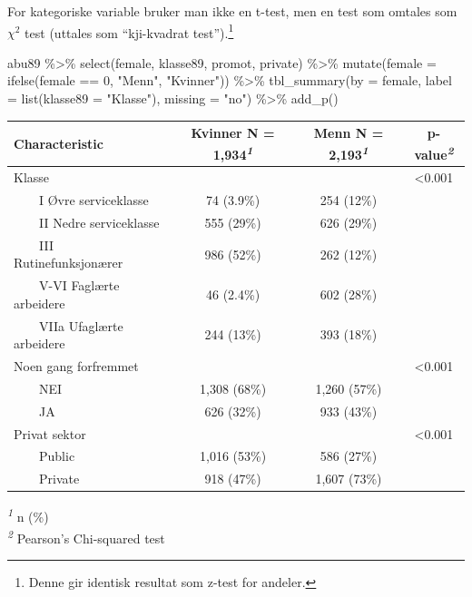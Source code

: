 \documentclass[
  norsk,
  letterpaper,
  DIV=11,
  numbers=noendperiod]{scrreprt}
\newenvironment{Shaded}{\begin{snugshade}}{\end{snugshade}}
\newcommand{\AttributeTok}[1]{\textcolor[rgb]{0.40,0.45,0.13}{#1}}
\newcommand{\DecValTok}[1]{\textcolor[rgb]{0.68,0.00,0.00}{#1}}
\newcommand{\FunctionTok}[1]{\textcolor[rgb]{0.28,0.35,0.67}{#1}}
\newcommand{\NormalTok}[1]{\textcolor[rgb]{0.00,0.23,0.31}{#1}}
\newcommand{\SpecialCharTok}[1]{\textcolor[rgb]{0.37,0.37,0.37}{#1}}
\newcommand{\StringTok}[1]{\textcolor[rgb]{0.13,0.47,0.30}{#1}}
\theoremstyle{definition}
\theoremstyle{remark}
\begin{document}
For kategoriske variable bruker man ikke en t-test, men en test som
omtales som \(\chi^2\) test (uttales som ``kji-kvadrat
test'').\footnote{Denne gir identisk resultat som z-test for andeler.}

\begin{Shaded}
\begin{Highlighting}[]
\NormalTok{abu89 }\SpecialCharTok{\%\textgreater{}\%} 
  \FunctionTok{select}\NormalTok{(female, klasse89, promot, private) }\SpecialCharTok{\%\textgreater{}\%} 
  \FunctionTok{mutate}\NormalTok{(}\AttributeTok{female =} \FunctionTok{ifelse}\NormalTok{(female }\SpecialCharTok{==} \DecValTok{0}\NormalTok{, }\StringTok{"Menn"}\NormalTok{, }\StringTok{"Kvinner"}\NormalTok{)) }\SpecialCharTok{\%\textgreater{}\%} 
    \FunctionTok{tbl\_summary}\NormalTok{(}\AttributeTok{by =}\NormalTok{ female, }
                \AttributeTok{label =} \FunctionTok{list}\NormalTok{(}\AttributeTok{klasse89 =} \StringTok{"Klasse"}\NormalTok{), }
              \AttributeTok{missing =} \StringTok{"no"}\NormalTok{) }\SpecialCharTok{\%\textgreater{}\%} 
  \FunctionTok{add\_p}\NormalTok{() }
\end{Highlighting}
\end{Shaded}

\begin{table}
\fontsize{12.0pt}{14.0pt}\selectfont
\begin{tabular*}{\linewidth}{@{\extracolsep{\fill}}lccc}
\toprule
\textbf{Characteristic} & \textbf{Kvinner}  N = 1,934\textsuperscript{\textit{1}} & \textbf{Menn}  N = 2,193\textsuperscript{\textit{1}} & \textbf{p-value}\textsuperscript{\textit{2}} \\ 
\midrule\addlinespace[2.5pt]
Klasse &  &  & <0.001 \\ 
    I Øvre serviceklasse & 74 (3.9\%) & 254 (12\%) &  \\ 
    II Nedre serviceklasse & 555 (29\%) & 626 (29\%) &  \\ 
    III Rutinefunksjonærer & 986 (52\%) & 262 (12\%) &  \\ 
    V-VI Faglærte arbeidere & 46 (2.4\%) & 602 (28\%) &  \\ 
    VIIa Ufaglærte arbeidere & 244 (13\%) & 393 (18\%) &  \\ 
Noen gang forfremmet &  &  & <0.001 \\ 
    NEI & 1,308 (68\%) & 1,260 (57\%) &  \\ 
    JA & 626 (32\%) & 933 (43\%) &  \\ 
Privat sektor &  &  & <0.001 \\ 
    Public & 1,016 (53\%) & 586 (27\%) &  \\ 
    Private & 918 (47\%) & 1,607 (73\%) &  \\ 
\bottomrule
\end{tabular*}
\begin{minipage}{\linewidth}
\vspace{.05em}
\textsuperscript{\textit{1}} n (\%)\\
\textsuperscript{\textit{2}} Pearson's Chi-squared test\\
\end{minipage}
\end{table}
\end{document}
